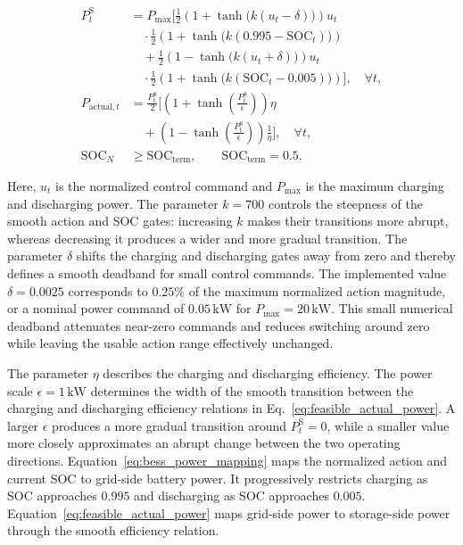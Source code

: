 \documentclass[12pt]{article}
\begin{document}
\begin{align}
P_t^{\mathrm S} &= P_{\max}\Big[
\frac{1}{2}\left(1+\tanh\bigl(k(u_t-\delta)\bigr)\right)u_t
\nonumber\\
&\quad {}\cdot
\frac{1}{2}\left(1+\tanh\bigl(k(0.995-\mathrm{SOC}_t)\bigr)\right)
\nonumber\\
&\quad {}+ \frac{1}{2}\left(1-\tanh\bigl(k(u_t+\delta)\bigr)\right)u_t
\nonumber\\
&\quad {}\cdot
\frac{1}{2}\left(1+\tanh\bigl(k(\mathrm{SOC}_t-0.005)\bigr)\right)
\Big], \quad \forall t,
\label{eq:bess_power_mapping} \\[1ex]
P_{\mathrm{actual},t} &= \frac{P_t^{\mathrm S}}{2}
\Biggl[
\left(1+\tanh\left(\frac{P_t^{\mathrm S}}{\epsilon}\right)\right)\eta
\nonumber\\
&\quad {}+ \left(1-\tanh\left(\frac{P_t^{\mathrm S}}{\epsilon}\right)\right)\frac{1}{\eta}
\Biggr],
\quad \forall t,
\label{eq:feasible_actual_power} \\[1ex]
\mathrm{SOC}_N &\geq \mathrm{SOC}_{\mathrm{term}},
\qquad \mathrm{SOC}_{\mathrm{term}}=0.5.
\label{eq:terminal_soc_requirement}
\end{align}

Here, $u_t$ is the normalized control command and $P_{\max}$ is the maximum charging and discharging power. The parameter $k=700$ controls the steepness of the smooth action and SOC gates: increasing $k$ makes their transitions more abrupt, whereas decreasing it produces a wider and more gradual transition. The parameter $\delta$ shifts the charging and discharging gates away from zero and thereby defines a smooth deadband for small control commands. The implemented value $\delta=0.0025$ corresponds to $0.25\%$ of the maximum normalized action magnitude, or a nominal power command of $0.05\,\mathrm{kW}$ for $P_{\max}=20\,\mathrm{kW}$. This small numerical deadband attenuates near-zero commands and reduces switching around zero while leaving the usable action range effectively unchanged.

The parameter $\eta$ describes the charging and discharging efficiency. The power scale $\epsilon=1\,\mathrm{kW}$ determines the width of the smooth transition between the charging and discharging efficiency relations in Eq.~\eqref{eq:feasible_actual_power}. A larger $\epsilon$ produces a more gradual transition around $P_t^{\mathrm S}=0$, while a smaller value more closely approximates an abrupt change between the two operating directions. Equation~\eqref{eq:bess_power_mapping} maps the normalized action and current SOC to grid-side battery power. It progressively restricts charging as SOC approaches $0.995$ and discharging as SOC approaches $0.005$. Equation~\eqref{eq:feasible_actual_power} maps grid-side power to storage-side power through the smooth efficiency relation.
\end{document}
